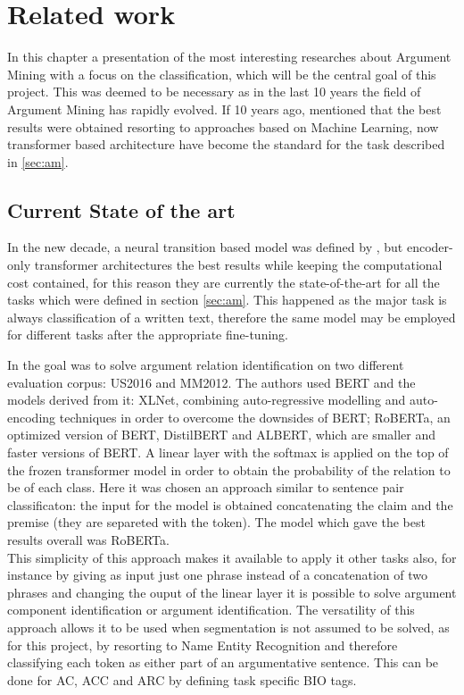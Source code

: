 \chapter{Related work}\label{chapter:2}
In this chapter a presentation of the most interesting researches about Argument Mining with a focus on the classification, which will be the central goal of this project. This was deemed to be necessary as in the last 10 years
the field of Argument Mining has rapidly evolved. If 10 years ago, \textcite{torr} mentioned that the best results were obtained resorting to approaches based on Machine Learning, now transformer based architecture have become the
standard for the task described in \ref{sec:am}.
\section{Current State of the art}
\noindent In the new decade, a neural transition based model was defined by \textcite{bao}, but encoder-only transformer architectures the best results while keeping the computational cost contained,
for this reason they are currently the state-of-the-art for all the tasks which were defined in section \ref{sec:am}. This happened as the major task is always
classification of a written text, therefore the same model may be employed for different tasks after the appropriate fine-tuning. 


In \textcite{trans} the goal was to solve argument relation identification on two different evaluation corpus: US2016 and MM2012. 
The authors used BERT and the models derived from it: XLNet, combining auto-regressive modelling and auto-encoding techniques in order to overcome the downsides of BERT; RoBERTa, an optimized
version of BERT, DistilBERT and ALBERT, which are smaller and faster versions of BERT. A linear layer with the softmax is applied on the top of the frozen transformer model in order to obtain the
probability of the relation to be of each class.
Here it was chosen an approach similar to sentence pair classificaton: the input for the model is obtained concatenating the 
claim and the premise (they are separeted with the \code{[SEP]} token). The model which gave the best results overall was RoBERTa.\\
This simplicity of this approach makes it available to apply it other tasks also, for instance by giving as input just one phrase instead of a concatenation of two phrases and changing the ouput of the linear 
layer it is possible to solve
argument component identification or argument identification. The versatility of this approach allows it to be used when segmentation is not assumed to be solved, as for this project, by resorting to 
Name Entity Recognition and therefore classifying each token as either part of an argumentative sentence. This can be done for AC, ACC and ARC by defining task specific BIO tags.

